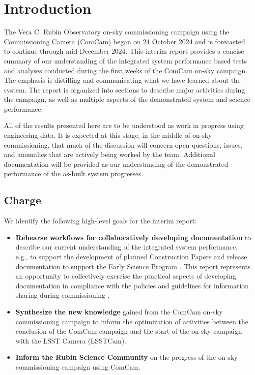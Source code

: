 \section{Introduction}
\label{sec:introduction}

The Vera C. Rubin Observatory on-sky commissioning campaign using the Commissioning Camera (ComCam) began on 24 October 2024 and is forecasted to continue through mid-December 2024.
This interim report provides a concise summary of our understanding of the integrated system performance based tests and analyses conducted during the first weeks of the ComCam on-sky campaign.
The emphasis is distilling and communicating what we have learned about the system.
The report is organized into sections to describe major activities during the campaign, as well as multiple aspects of the demonstrated system and science performance.

\begin{warning}
All of the results presented here are to be understood as work in progress using engineering data.
It is expected at this stage, in the middle of on-sky commissioning, that much of the discussion will concern open questions, issues, and anomalies that are actively being worked by the team.
Additional documentation will be provided as our understanding of the demonstrated performance of the as-built system progresses.
\end{warning}

\subsection{Charge}

We identify the following high-level goals for the interim report:

\begin{itemize}

    \item \textbf{Rehearse workflows for collaboratively developing documentation} to describe our current understanding of the integrated system performance, e.g., to support the development of planned Construction Papers and release documentation to support the Early Science Program .
    This report represents an opportunity to collectively exercise the practical aspects of developing documentation in compliance with the policies and guidelines for information sharing during commissioning .

    \item \textbf{Synthesize the new knowledge} gained from the ComCam on-sky commissioning campaign to inform the optimization of activities between the conclusion of the ComCam campaign and the start of the on-sky campaign with the LSST Camera (LSSTCam).

    \item \textbf{Inform the Rubin Science Community} on the progress of the on-sky commissioning campaign using ComCam.

\end{itemize}

